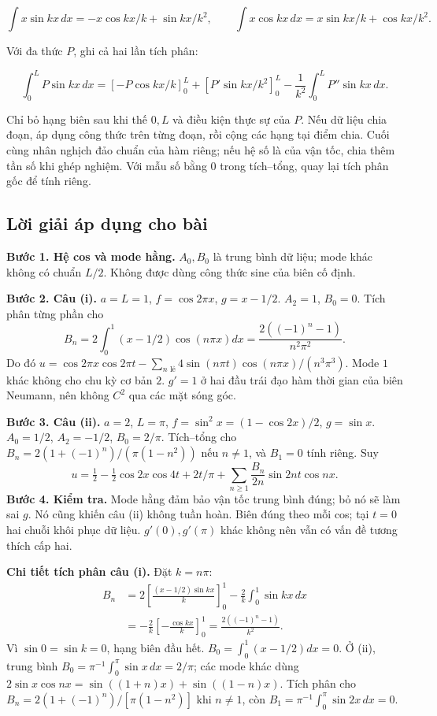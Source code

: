 \documentclass[10pt,a4paper]{article}
\begin{document}
\[
\int x\sin kx\,dx=-x\cos kx/k+\sin kx/k^2,\qquad
\int x\cos kx\,dx=x\sin kx/k+\cos kx/k^2.
\]


Với đa thức $P$, ghi cả hai lần tích phân:


\[
\int_0^L P\sin kx\,dx
=\left[-P\cos kx/k\right]_0^L+
\left[P'\sin kx/k^2\right]_0^L-
\frac1{k^2}\int_0^L P''\sin kx\,dx.
\]


Chỉ bỏ hạng biên sau khi thế $0,L$ và điều kiện thực sự của $P$. Nếu dữ liệu chia đoạn, áp dụng công thức trên từng đoạn, rồi cộng các hạng tại điểm chia. Cuối cùng nhân nghịch đảo chuẩn của hàm riêng; nếu hệ số là của vận tốc, chia thêm tần số khi ghép nghiệm. Với mẫu số bằng $0$ trong tích–tổng, quay lại tích phân gốc để tính riêng.
\subsection*{Lời giải áp dụng cho bài}
\textbf{Bước 1. Hệ cos và mode hằng.} $A_0,B_0$ là trung bình dữ liệu; mode khác không có chuẩn $L/2$. Không được dùng công thức sine của biên cố định.

\textbf{Bước 2. Câu (i).} $a=L=1$, $f=\cos2\pi x$, $g=x-1/2$. $A_2=1$, $B_0=0$. Tích phân từng phần cho
\[B_n=2\int_0^1(x-1/2)\cos(n\pi x)dx=\frac{2((-1)^n-1)}{n^2\pi^2}.\]
Do đó $u=\cos2\pi x\cos2\pi t-\sum_{n\text{ lẻ}}4\sin(n\pi t)\cos(n\pi x)/(n^3\pi^3)$. Mode $1$ khác không cho chu kỳ cơ bản $2$. $g'=1$ ở hai đầu trái đạo hàm thời gian của biên Neumann, nên không $C^2$ qua các mặt sóng góc.

\textbf{Bước 3. Câu (ii).} $a=2$, $L=\pi$, $f=\sin^2x=(1-\cos2x)/2$, $g=\sin x$. $A_0=1/2$, $A_2=-1/2$, $B_0=2/\pi$. Tích–tổng cho $B_n=2(1+(-1)^n)/(\pi(1-n^2))$ nếu $n\ne1$, và $B_1=0$ tính riêng. Suy
\[u=\tfrac12-\tfrac12\cos2x\cos4t+2t/\pi+\sum_{n\ge1}\frac{B_n}{2n}\sin2nt\cos nx.\]
\textbf{Bước 4. Kiểm tra.} Mode hằng đảm bảo vận tốc trung bình đúng; bỏ nó sẽ làm sai $g$. Nó cũng khiến câu (ii) không tuần hoàn. Biên đúng theo mỗi cos; tại $t=0$ hai chuỗi khôi phục dữ liệu. $g'(0),g'(\pi)$ khác không nên vẫn có vấn đề tương thích cấp hai.

\textbf{Chi tiết tích phân câu (i).} Đặt $k=n\pi$:
\[\begin{aligned}
B_n&=2\left[\frac{(x-1/2)\sin kx}{k}\right]_0^1-\frac2k\int_0^1\sin kx\,dx\\
&=-\frac2k\left[-\frac{\cos kx}{k}\right]_0^1
=\frac{2((-1)^n-1)}{k^2}.
\end{aligned}\]
Vì $\sin0=\sin k=0$, hạng biên đầu hết. $B_0=\int_0^1(x-1/2)dx=0$. Ở (ii), trung bình $B_0=\pi^{-1}\int_0^\pi\sin x\,dx=2/\pi$; các mode khác dùng $2\sin x\cos nx=\sin((1+n)x)+\sin((1-n)x)$. Tích phân cho $B_n=2(1+(-1)^n)/[\pi(1-n^2)]$ khi $n\ne1$, còn $B_1=\pi^{-1}\int_0^\pi\sin2x\,dx=0$.
\end{document}
